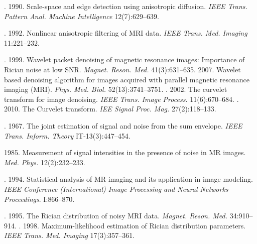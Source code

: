   \begin{multicols}{2}

\renewcommand{\bibname}{\protect\rmfamily References}

{\small\frenchspacing
 {%
 \begin{thebibliography}{99}
. 1990.
Scale-space and edge detection using anisotropic
diffusion. \textit{IEEE Trans. Pattern Anal. Machine Intelligence}
12(7):629--639.
\columnbreak

. 1992.
Nonlinear anisotropic filtering of
MRI data. \textit{IEEE Trans. Med. Imaging} 11:221--232.

\vspace*{-2pt}

. 1999.
Wavelet packet denoising of magnetic resonance
images: Importance of Rician noise at low SNR. \textit{Magnet. Reson. Med.} 41(3):631--635.
2007. Wavelet based denoising algorithm for images acquired with parallel
magnetic resonance imaging (MRI). \textit{Phys. Med. Biol.} 52(13):3741--3751.
. 2002.
The curvelet transform for image denoising.
\textit{IEEE Trans. Image Process.} 11(6):670--684.
. 2010.
The Curvelet transform. \textit{IEE Signal Proc. Mag.} 27(2):118--133.


. 1967.
The joint estimation of signal and noise from the sum
envelope. \textit{IEEE Trans. Inform. Theory} IT-13(3):447--454.


 1985.
Measurement of signal intensities in the presence of noise in MR
images. \textit{Med. Phys.} 12(2):232--233.

. 1994.
Statistical analysis of MR imaging and its application in image
modeling. \textit{IEEE Conference (International) Image Processing
and Neural Networks Proceedings}. I:866--870.

. 1995.
The Rician distribution of noisy MRI data. \textit{Magnet.
Reson. Med.} 34:910--914.
. 1998.
Maximum-likelihood
estimation of Rician distribution parameters. \textit{IEEE Trans.
Med. Imaging} 17(3):357--361.



\end{thebibliography}}}
\end{multicols}

